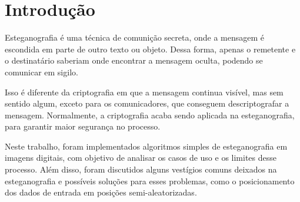 \section{Introdução} \label{sec:introducao}

Esteganografia é uma técnica de comunição secreta, onde a mensagem é escondida em parte de outro texto ou objeto. Dessa forma, apenas o remetente e o destinatário saberiam onde encontrar a mensagem oculta, podendo se comunicar em sigilo.

Isso é diferente da criptografia em que a mensagem continua visível, mas sem sentido algum, exceto para os comunicadores, que conseguem descriptografar a mensagem. Normalmente, a criptografia acaba sendo aplicada na esteganografia, para garantir maior segurança no processo.

Neste trabalho, foram implementados algoritmos simples de esteganografia em imagens digitais, com objetivo de analisar os casos de uso e os limites desse processo. Além disso, foram discutidos alguns vestígios comuns deixados na esteganografia e possíveis soluções para esses problemas, como o posicionamento dos dados de entrada em posições semi-aleatorizadas.
